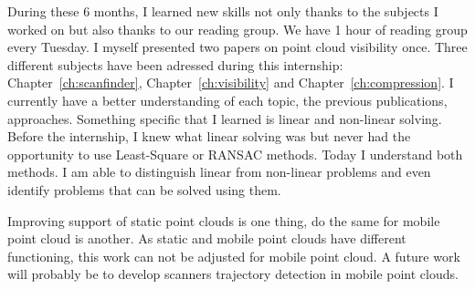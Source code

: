 During these 6 months, I learned new skills not only thanks to the subjects I worked on but also thanks to our reading group. We have 1 hour of reading group every Tuesday. I myself presented two papers on point cloud visibility once. Three different subjects have been adressed during this internship: Chapter~\ref{ch:scanfinder}, Chapter~\ref{ch:visibility} and Chapter~\ref{ch:compression}. I currently have a better understanding of each topic, the previous publications,
approaches. Something specific that I learned is linear and non-linear solving. Before the internship, I knew what linear solving was but never had the opportunity to use Least-Square or RANSAC methods. Today I understand both methods. I am able to distinguish linear from non-linear problems and even identify problems that can be solved using them.

Improving support of static point clouds is one thing, do the same for mobile point cloud is another. As static and mobile point clouds have different functioning, this work can not be adjusted for mobile point cloud. A future work will probably be to develop scanners trajectory detection in mobile point clouds.